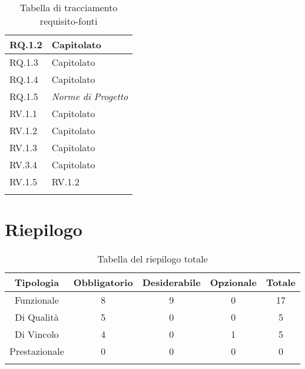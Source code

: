 \begin{center}
\begin{longtable}{|C{6cm}|C{6cm}|}
    RQ.1.2 & Capitolato \\ \hline
    RQ.1.3 & Capitolato \\ \hline
    RQ.1.4 & Capitolato \\ \hline
    RQ.1.5 & \textit{Norme di Progetto} \\ \hline
    RV.1.1 & Capitolato \\ \hline
    RV.1.2 & Capitolato \\ \hline
    RV.1.3 & Capitolato \\ \hline
    RV.3.4 & Capitolato \\ \hline
    RV.1.5 & RV.1.2 \\ \hline

    \caption{Tabella di tracciamento requisito-fonti}
  \end{longtable}
\end{center}


\section{Riepilogo}

\begin{center}
  \centering
  \begin{longtable}{|c|c|c|c|c|}
    \hline
    \rowcolor[HTML]{036400}
    {\color[HTML]{FFFFFF} \textbf{Tipologia}} & {\color[HTML]{FFFFFF} \textbf{Obbligatorio}} & {\color[HTML]{FFFFFF} \textbf{Desiderabile}} & {\color[HTML]{FFFFFF} \textbf{Opzionale}}  & {\color[HTML]{FFFFFF} \textbf{Totale}} \\ \hline
    \rowcolor[HTML]{EFEFEF}
    Funzionale & 8 & 9 & 0 & 17 \\ \hline
    \rowcolor[HTML]{C0C0C0}
    Di Qualità & 5 & 0 & 0 & 5 \\ \hline
    \rowcolor[HTML]{EFEFEF}
    Di Vincolo & 4 & 0 & 1 & 5 \\ \hline
    \rowcolor[HTML]{C0C0C0}
    Prestazionale & 0 & 0 & 0 & 0 \\ \hline

    \caption{Tabella del riepilogo totale}
  \end{longtable}
\end{center}
